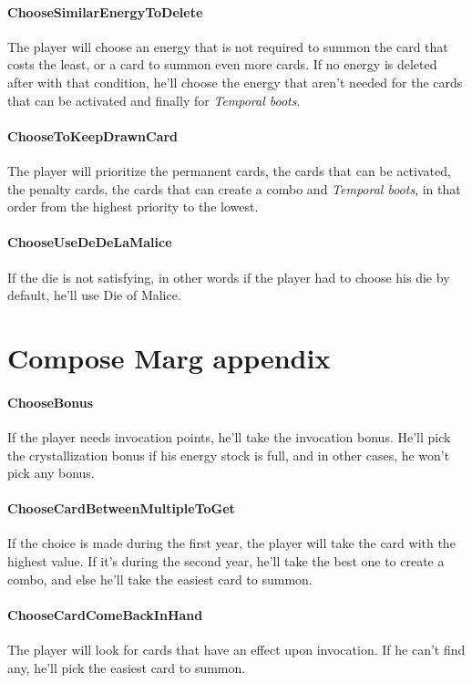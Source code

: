 \begin{appendices}
\paragraph{ChooseSimilarEnergyToDelete}
The player will choose an energy that is not required to summon the card that costs the least, or a card to summon even more cards. If no energy is deleted after with that condition, he'll choose the energy that aren't needed for the cards that can be activated and finally for \textit{Temporal boots}.

\paragraph{ChooseToKeepDrawnCard}
The player will prioritize the permanent cards, the cards that can be activated, the penalty cards, the cards that can create a combo and \textit{Temporal boots}, in that order from the highest priority to the lowest.

\paragraph{ChooseUseDeDeLaMalice}
If the die is not satisfying, in other words if the player had to choose his die by default, he'll use Die of Malice.

\section{Compose Marg appendix}\label{appendix:compose_marg}

    \paragraph{ChooseBonus}
    If the player needs invocation points, he'll take the invocation bonus. He'll pick the crystallization bonus if his energy stock is full, and in other cases, he won't pick any bonus.
    
    \paragraph{ChooseCardBetweenMultipleToGet}
    If the choice is made during the first year, the player will take the card with the highest value. If it's during the second year, he'll take the best one to create a combo, and else he'll take the easiest card to summon.
    
    \paragraph{ChooseCardComeBackInHand}
    The player will look for cards that have an effect upon invocation. If he can't find any, he'll pick the easiest card to summon.


\end{appendices}
